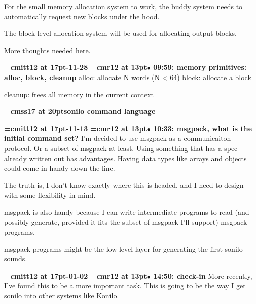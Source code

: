 For the small memory allocation system to work, the buddy system needs to automatically request new blocks under the hood.
\par

The block-level allocation system will be used for allocating output blocks.
\par

More thoughts needed here.
\par

{\medskip\noindent\bf\font\titlefont=cmitt12 at 17pt-11-28}\medskip
{\smallskip\noindent\bf\font\titlefont=cmr12 at 13pt\titlefont $\bullet$ 09:59: memory primitives: alloc, block, cleanup}\smallskip
alloc: allocate N words (N < 64) block: allocate a block
\par

cleanup: frees all memory in the current context
\par

{\medskip\noindent\bf\font\titlefont=cmss17 at 20pt\titlefont sonilo command language}\medskip

{\medskip\noindent\bf\font\titlefont=cmitt12 at 17pt-11-13}\medskip
{\smallskip\noindent\bf\font\titlefont=cmr12 at 13pt\titlefont $\bullet$ 10:33: msgpack, what is the initial command set?}\smallskip
I'm decided to use msgpack as a communicaiton protocol. Or a subset of msgpack at least. Using something that has a spec already written out has advantages. Having data types like arrays and objects could come in handy down the line.
\par

The truth is, I don't know exactly where this is headed, and I need to design with some flexibility in mind.
\par

msgpack is also handy because I can write intermediate programs to read (and possibly generate, provided it fits the subset of msgpack I'll support) msgpack programs.
\par

msgpack programs might be the low-level layer for generating the first sonilo sounds.
\par

{\medskip\noindent\bf\font\titlefont=cmitt12 at 17pt-01-02}\medskip
{\smallskip\noindent\bf\font\titlefont=cmr12 at 13pt\titlefont $\bullet$ 14:50: check-in}\smallskip
More recently, I've found this to be a more important task. This is going to be the way I get sonilo into other systems like Konilo.
\par

